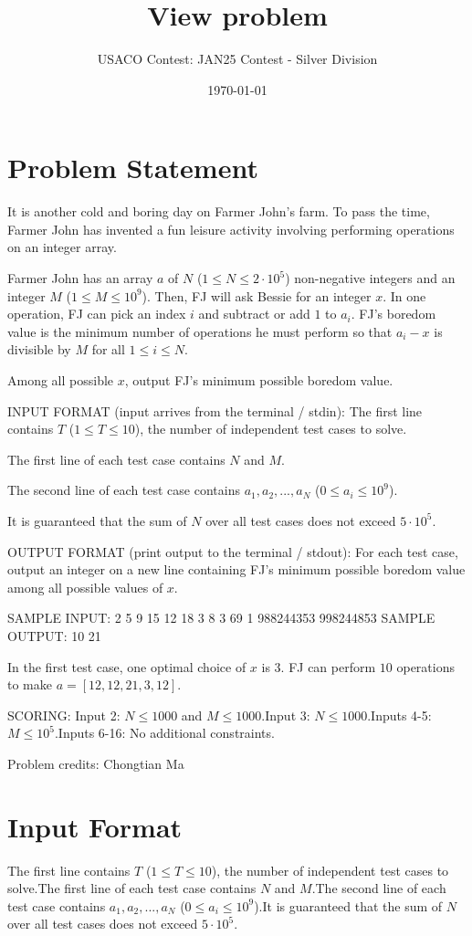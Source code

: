 \documentclass[12pt]{article}
\title{View problem}
\author{USACO Contest: JAN25 Contest - Silver Division}
\date{\today}
\begin{document}
\maketitle

\section*{Problem Statement}


It is another cold and boring day on Farmer John's farm. To pass the time, Farmer
John has invented a fun leisure activity involving performing operations on an
integer array.

Farmer John has an array $a$ of $N$ ($1 \leq N \leq 2 \cdot 10^5$)
non-negative integers and an integer $M$ ($1 \leq M \leq 10^9$). Then,
FJ will ask Bessie for an integer $x$. In one operation, FJ can pick
an index $i$ and subtract or add $1$ to $a_i$. FJ's boredom value is
the minimum number of operations he must perform so that $a_i-x$ is
divisible by $M$ for all $1 \leq i \leq N$.

Among all possible $x$, output FJ's minimum possible boredom value.

INPUT FORMAT (input arrives from the terminal / stdin):
The first line contains $T$ ($1 \leq T \leq 10$), the number of independent test
cases to solve.

The first line of each test case contains $N$ and $M$.

The second line of each test case contains $a_1, a_2, ..., a_N$
($0 \leq a_i \leq 10^9$).

It is guaranteed that the sum of $N$ over all test cases does not exceed
$5 \cdot 10^5$.


OUTPUT FORMAT (print output to the terminal / stdout):
For each test case, output an integer on a new line containing FJ's minimum
possible boredom value among all possible values of $x$.

SAMPLE INPUT:
2
5 9
15 12 18 3 8
3 69
1 988244353 998244853
SAMPLE OUTPUT: 
10
21

In the first test case, one optimal choice of $x$ is $3$. FJ can perform $10$
operations to make
$a = [12, 12, 21, 3, 12]$.

SCORING:
Input 2: $N \le 1000$ and $M \le 1000$.Input 3:
$N\le 1000$.Inputs 4-5: $M\le 10^5$.Inputs 6-16: No
additional constraints.


Problem credits: Chongtian Ma



\section*{Input Format}
The first line contains $T$ ($1 \leq T \leq 10$), the number of independent test
cases to solve.The first line of each test case contains $N$ and $M$.The second line of each test case contains $a_1, a_2, ..., a_N$
($0 \leq a_i \leq 10^9$).It is guaranteed that the sum of $N$ over all test cases does not exceed
$5 \cdot 10^5$.
\end{document}
